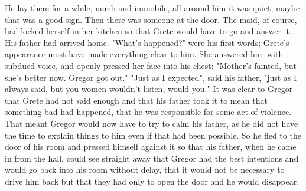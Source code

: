 \documentclass[12pt]{book}
\begin{document}
    He lay there for a while, numb and immobile, all around him it was quiet, maybe that was a good sign. Then there was someone at the door. The maid, of course, had locked herself in her kitchen so that Grete would have to go and answer it. His father had arrived home. "What's happened?" were his first words; Grete's appearance must have made everything clear to him. She answered him with subdued voice, and openly pressed her face into his chest: "Mother's fainted, but she's better now. Gregor got out." "Just as I expected", said his father, "just as I always said, but you women wouldn't listen, would you." It was clear to Gregor that Grete had not said enough and that his father took it to mean that something bad had happened, that he was responsible for some act of violence. That meant Gregor would now have to try to calm his father, as he did not have the time to explain things to him even if that had been possible. So he fled to the door of his room and pressed himself against it so that his father, when he came in from the hall, could see straight away that Gregor had the best intentions and would go back into his room without delay, that it would not be necessary to drive him back but that they had only to open the door and he would disappear.
\end{document}
